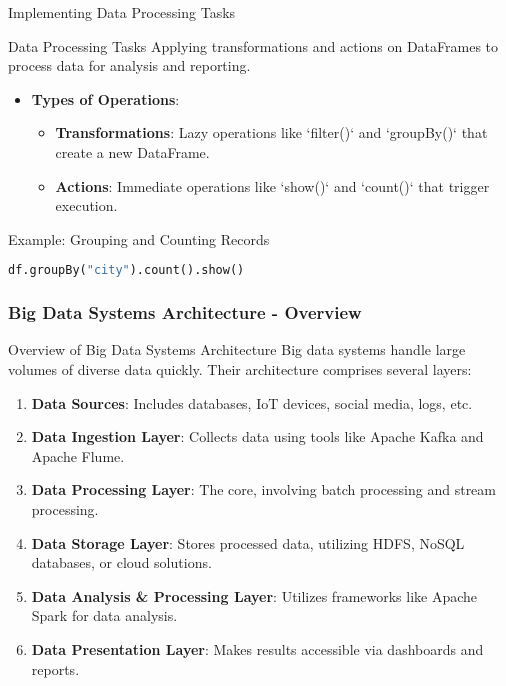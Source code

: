 \documentclass[aspectratio=169]{beamer}
\begin{document}
\begin{frame}[fragile]{Implementing Data Processing Tasks}
    \begin{block}{Data Processing Tasks}
        Applying transformations and actions on DataFrames to process data for analysis and reporting.
    \end{block}

    \begin{itemize}
        \item \textbf{Types of Operations}:
        \begin{itemize}
            \item \textbf{Transformations}: Lazy operations like `filter()` and `groupBy()` that create a new DataFrame.
            \item \textbf{Actions}: Immediate operations like `show()` and `count()` that trigger execution.
        \end{itemize}
    \end{itemize}

    \begin{block}{Example: Grouping and Counting Records}
        \begin{lstlisting}[language=python]
df.groupBy("city").count().show()
        \end{lstlisting}
    \end{block}
\end{frame}

\begin{frame}[fragile]
  \frametitle{Big Data Systems Architecture - Overview}
  \begin{block}{Overview of Big Data Systems Architecture}
    Big data systems handle large volumes of diverse data quickly. Their architecture comprises several layers:
  \end{block}
  \begin{enumerate}
    \item \textbf{Data Sources}: Includes databases, IoT devices, social media, logs, etc.
    \item \textbf{Data Ingestion Layer}: Collects data using tools like Apache Kafka and Apache Flume.
    \item \textbf{Data Processing Layer}: The core, involving batch processing and stream processing.
    \item \textbf{Data Storage Layer}: Stores processed data, utilizing HDFS, NoSQL databases, or cloud solutions.
    \item \textbf{Data Analysis \& Processing Layer}: Utilizes frameworks like Apache Spark for data analysis.
    \item \textbf{Data Presentation Layer}: Makes results accessible via dashboards and reports.
  \end{enumerate}
\end{frame}
\end{document}
